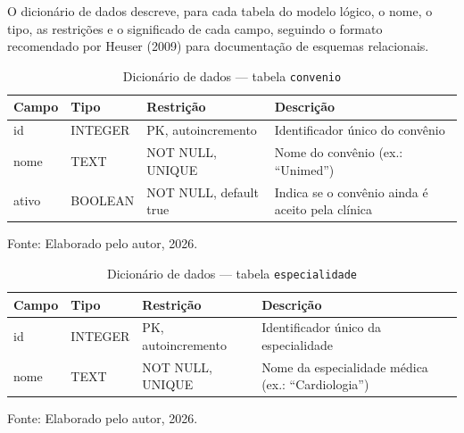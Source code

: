 \documentclass[12pt,a4paper]{extarticle}
\begin{document}
O dicionário de dados descreve, para cada tabela do modelo lógico, o nome, o tipo, as restrições e o significado de cada campo, seguindo o formato recomendado por Heuser (2009) para documentação de esquemas relacionais.

\begin{table}[H]
    \centering
    \caption{Dicionário de dados --- tabela \texttt{convenio}}
    {\small
    \begin{tabularx}{\textwidth}{@{}L{3.3cm} L{1.8cm} L{4.0cm} Y@{}}
        \toprule
        \textbf{Campo} & \textbf{Tipo} & \textbf{Restrição} & \textbf{Descrição} \\
        \midrule
        id & INTEGER & PK, autoincremento & Identificador único do convênio \\
        nome & TEXT & NOT NULL, UNIQUE & Nome do convênio (ex.: ``Unimed'') \\
        ativo & BOOLEAN & NOT NULL, default true & Indica se o convênio ainda é aceito pela clínica \\
        \bottomrule
    \end{tabularx}
    }
    \vspace{0.12cm}
    {\raggedright\footnotesize Fonte: Elaborado pelo autor, 2026.\par}
\end{table}

\begin{table}[H]
    \centering
    \caption{Dicionário de dados --- tabela \texttt{especialidade}}
    {\small
    \begin{tabularx}{\textwidth}{@{}L{3.3cm} L{1.8cm} L{4.0cm} Y@{}}
        \toprule
        \textbf{Campo} & \textbf{Tipo} & \textbf{Restrição} & \textbf{Descrição} \\
        \midrule
        id & INTEGER & PK, autoincremento & Identificador único da especialidade \\
        nome & TEXT & NOT NULL, UNIQUE & Nome da especialidade médica (ex.: ``Cardiologia'') \\
        \bottomrule
    \end{tabularx}
    }
    \vspace{0.12cm}
    {\raggedright\footnotesize Fonte: Elaborado pelo autor, 2026.\par}
\end{table}
\end{document}
